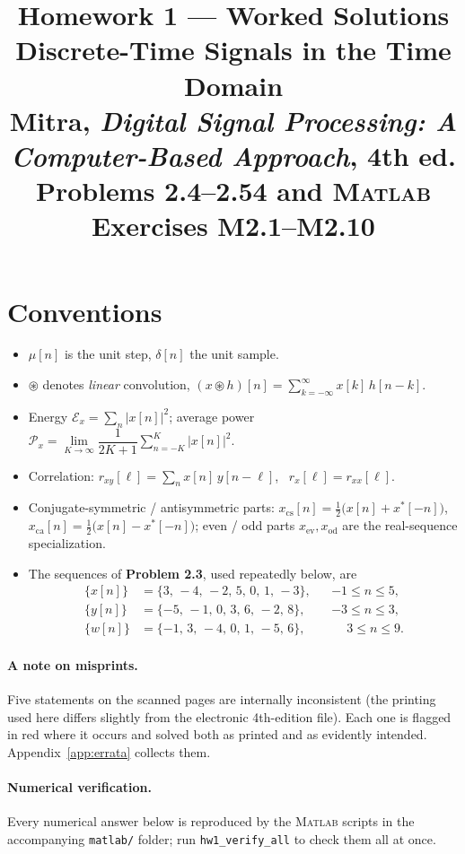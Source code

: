 \documentclass[11pt]{article}
\title{\vspace{-1.6cm}\textbf{Homework 1 --- Worked Solutions}\\[3pt]
\large Discrete-Time Signals in the Time Domain\\[3pt]
\normalsize Mitra, \emph{Digital Signal Processing: A Computer-Based Approach}, 4th ed.\\
\normalsize Problems 2.4--2.54 and \textsc{Matlab} Exercises M2.1--M2.10}
\date{}
\author{}
\begin{document}
\maketitle
\thispagestyle{fancy}
\vspace{-1.3cm}

\section*{Conventions}

\begin{itemize}[leftmargin=1.4em,itemsep=1pt]
\item $\mu[n]$ is the unit step, $\delta[n]$ the unit sample.
\item $\circledast$ denotes \emph{linear} convolution,
      $\displaystyle (x\circledast h)[n]=\sum_{k=-\infty}^{\infty}x[k]\,h[n-k]$.
\item Energy $\mathcal{E}_x=\sum_n |x[n]|^2$; average power
      $\mathcal{P}_x=\lim\limits_{K\to\infty}\dfrac{1}{2K+1}\sum_{n=-K}^{K}|x[n]|^2$.
\item Correlation: $r_{xy}[\ell]=\sum_n x[n]\,y[n-\ell]$, \ $r_{x}[\ell]=r_{xx}[\ell]$.
\item Conjugate-symmetric / antisymmetric parts:
      $x_{\mathrm{cs}}[n]=\tfrac12\bigl(x[n]+x^*[-n]\bigr)$,
      $x_{\mathrm{ca}}[n]=\tfrac12\bigl(x[n]-x^*[-n]\bigr)$;
      even / odd parts $x_{\mathrm{ev}},x_{\mathrm{od}}$ are the real-sequence specialization.
\item The sequences of \textbf{Problem 2.3}, used repeatedly below, are
\[
\begin{aligned}
\{x[n]\}&=\{3,\,-4,\,-2,\,5,\,0,\,1,\,-3\}, && -1\le n\le 5,\\
\{y[n]\}&=\{-5,\,-1,\,0,\,3,\,6,\,-2,\,8\}, && -3\le n\le 3,\\
\{w[n]\}&=\{-1,\,3,\,-4,\,0,\,1,\,-5,\,6\}, && \phantom{-}3\le n\le 9.
\end{aligned}
\]
\end{itemize}

\paragraph{A note on misprints.} Five statements on the scanned pages are internally
inconsistent (the printing used here differs slightly from the electronic 4th-edition file).
Each one is flagged in red where it occurs and solved both as printed and as evidently
intended. Appendix~\ref{app:errata} collects them.

\paragraph{Numerical verification.} Every numerical answer below is reproduced by the
\textsc{Matlab} scripts in the accompanying \texttt{matlab/} folder; run
\texttt{hw1\_verify\_all} to check them all at once.









\end{document}
